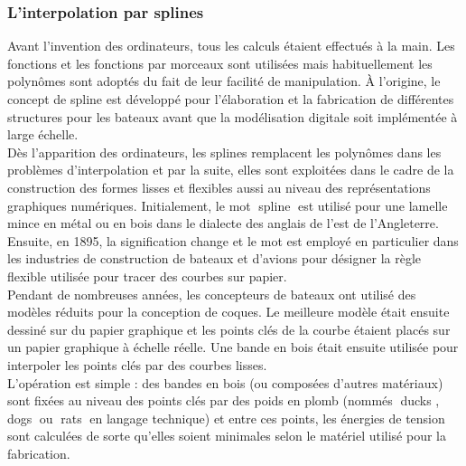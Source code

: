 \documentclass{article}
\begin{document}
\subsubsection{L'interpolation par splines}

	Avant l'invention des ordinateurs, tous les calculs \'{e}taient effectu\'{e}s \`{a} la main. Les fonctions et les fonctions par morceaux sont utilis\'{e}es mais habituellement les polyn\^{o}mes sont adopt\'{e}s du fait de leur facilit\'{e} de manipulation. \`{A} l'origine, le concept de spline est d\'{e}velopp\'{e} pour l'\'{e}laboration et la fabrication de diff\'{e}rentes structures pour les bateaux avant que la mod\'{e}lisation digitale soit impl\'{e}ment\'{e}e \`{a} large \'{e}chelle.
\\
\indent
	D\`{e}s l'apparition des ordinateurs, les splines remplacent les polyn\^{o}mes dans les probl\`{e}mes d'interpolation et par la suite, elles sont exploit\'{e}es dans le cadre de la construction des formes lisses et flexibles aussi au niveau des repr\'{e}sentations graphiques num\'{e}riques. Initialement, le mot \guillemotleft $\;$spline \guillemotright$\;$est utilis\'{e} pour une lamelle mince en m\'{e}tal ou en bois dans le dialecte des anglais de l'est de l'Angleterre.
\\
\indent
	Ensuite, en 1895, la signification change et le mot est employ\'{e} en particulier dans les industries de construction de bateaux et d'avions pour d\'{e}signer la r\`{e}gle flexible utilis\'{e}e pour tracer des courbes sur papier.
\\
\indent
	Pendant de nombreuses ann\'{e}es, les concepteurs de bateaux ont utilis\'{e} des mod\`{e}les r\'{e}duits pour la conception de coques. Le meilleure mod\`{e}le \'{e}tait ensuite dessin\'{e} sur du papier graphique et les points cl\'{e}s de la courbe \'{e}taient plac\'{e}s sur un papier graphique \`{a} \'{e}chelle r\'{e}elle. Une bande en bois \'{e}tait ensuite utilis\'{e}e pour interpoler les points cl\'{e}s par des courbes lisses.
\\
\indent
	L'op\'{e}ration est simple : des bandes en bois (ou compos\'{e}es d'autres mat\'{e}riaux) sont fix\'{e}es au niveau des points cl\'{e}s par des poids en plomb (nomm\'{e}s \guillemotleft$\;$ducks \guillemotright, \guillemotleft $\;$dogs \guillemotright$\;$ou \guillemotleft $\;$rats \guillemotright$\;$en langage technique) et entre ces points, les \'{e}nergies de tension sont calcul\'{e}es de sorte qu'elles soient minimales selon le mat\'{e}riel utilis\'{e} pour la fabrication.
\par
\end{document}
